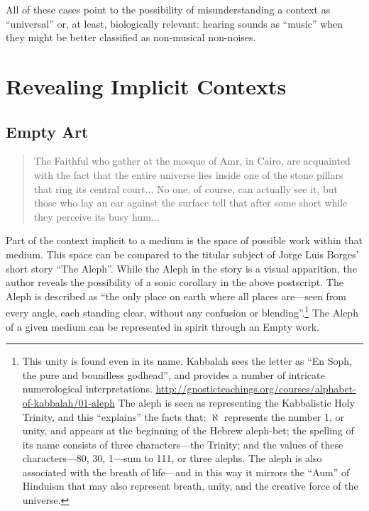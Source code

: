 \documentclass{thesis}
\begin{document}
All of these cases point to the possibility of misunderstanding a context as ``universal'' or, at least, biologically relevant: hearing sounds as ``music'' when they might be better classified as non-musical non-noises.

\chapter{Revealing Implicit Contexts}

\section{Empty Art}

	\begin{quote}
	The Faithful who gather at the mosque of Amr, in Cairo, are acquainted with the fact that the entire universe lies inside one of the stone pillars that ring its central court... No one, of course, can actually see it, but those who lay an ear against the surface tell that after some short while they perceive its busy hum...
	\end{quote}

Part of the context implicit to a medium is the space of possible work within that medium. This space can be compared to the titular subject of Jorge Luis Borges' short story ``The Aleph''\cite{borges_aleph_2004}. While the Aleph in the story is a visual apparition, the author reveals the possibility of a sonic corollary in the above postscript. The Aleph is described as ``the only place on earth where all places are---seen from every angle, each standing clear, without any confusion or blending''.\footnote{This unity is found even in its name. Kabbalah sees the letter as ``En Soph, the pure and boundless godhead'', and provides a number of intricate numerological interpretations. \url{http://gnosticteachings.org/courses/alphabet-of-kabbalah/01-aleph} The aleph is seen as representing the Kabbalistic Holy Trinity, and this ``explains'' the facts that: $\aleph$ represents the number 1, or unity, and appears at the beginning of the Hebrew aleph-bet; the spelling of its name consists of three characters---the Trinity; and the values of these characters---80, 30, 1---sum to 111, or three alephs. The aleph is also associated with the breath of life---and in this way it mirrors the ``Aum'' of Hinduism that may also represent breath, unity, and the creative force of the universe.} The Aleph of a given medium can be represented in spirit through an Empty work.
\end{document}
